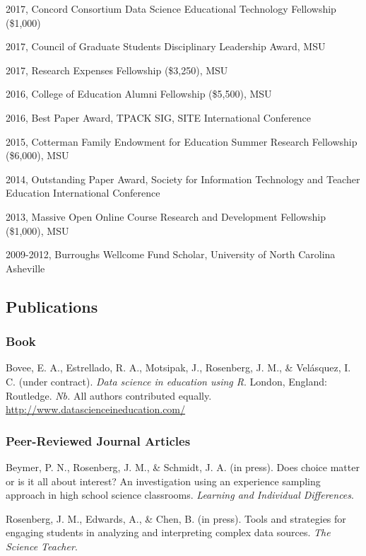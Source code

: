 \documentclass[14,]{article}
\begin{document}
2017, Concord Consortium Data Science Educational Technology Fellowship
(\$1,000)

2017, Council of Graduate Students Disciplinary Leadership Award, MSU

2017, Research Expenses Fellowship (\$3,250), MSU

2016, College of Education Alumni Fellowship (\$5,500), MSU

2016, Best Paper Award, TPACK SIG, SITE International Conference

2015, Cotterman Family Endowment for Education Summer Research
Fellowship (\$6,000), MSU

2014, Outstanding Paper Award, Society for Information Technology and
Teacher Education International Conference

2013, Massive Open Online Course Research and Development Fellowship
(\$1,000), MSU

2009-2012, Burroughs Wellcome Fund Scholar, University of North Carolina
Asheville

\hypertarget{publications}{%
\subsection{Publications}\label{publications}}

\hypertarget{book}{%
\subsubsection{Book}\label{book}}

Bovee, E. A., Estrellado, R. A., Motsipak, J., Rosenberg, J. M., \&
Velásquez, I. C. (under contract). \emph{Data science in education using
R}. London, England: Routledge. \emph{Nb.} All authors contributed
equally. \url{http://www.datascienceineducation.com/}

\hypertarget{peer-reviewed-journal-articles}{%
\subsubsection{Peer-Reviewed Journal
Articles}\label{peer-reviewed-journal-articles}}

Beymer, P. N., Rosenberg, J. M., \& Schmidt, J. A. (in press). Does
choice matter or is it all about interest? An investigation using an
experience sampling approach in high school science classrooms.
\emph{Learning and Individual Differences}.

Rosenberg, J. M., Edwards, A., \& Chen, B. (in press). Tools and
strategies for engaging students in analyzing and interpreting complex
data sources. \emph{The Science Teacher}.
\end{document}
